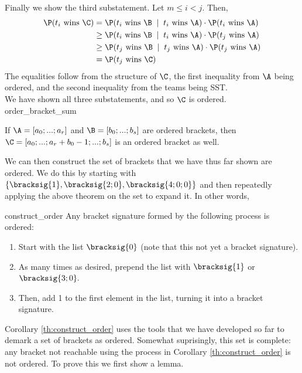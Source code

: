 {{Finally we show the third substatement. Let $m \leq i < j.$ Then,
\begin{align*}
    \P(t_i \textrm{ wins }\C) &= \P(t_i \textrm{ wins }\B \;\mid\; t_i \textrm{ wins } \A)\cdot \P(t_i \textrm{ wins } \A)\\
    &\geq \P(t_i \textrm{ wins }\B \;\mid\; t_i \textrm{ wins } \A)\cdot \P(t_j \textrm{ wins } \A)\\
    &\geq \P(t_j \textrm{ wins }\B \;\mid\; t_j \textrm{ wins } \A)\cdot \P(t_j \textrm{ wins } \A)\\
    &= \P(t_j \textrm{ wins }\C)
\end{align*}
The equalities follow from the structure of $\C$, the first inequality from $\A$ being ordered, and the second inequality from the teams being SST.\\

We have shown all three substatements, and so $\C$ is ordered.
}{order_bracket_sum}

\begin{corollary}{}{}
    If $\A = [a_0; ...; a_r]$ and $\B = [b_0; ...; b_s]$ are ordered brackets, then $\C = [a_0; ...; a_r + b_0 - 1; ...; b_s]$ is an ordered bracket as well.
\end{corollary}

We can then construct the set of brackets that we have thus far shown are ordered. We do this by starting with $\{\bracksig{1}, \bracksig{2; 0}, \bracksig{4; 0; 0}\}$ and then repeatedly applying the above theorem on the set to expand it. In other words,

\begin{corollary}{}{construct_order}
    Any bracket signature formed by the following process is ordered:
    \begin{enumerate}
        \item Start with the list $\bracksig{0}$ (note that this not yet a bracket signature).
        \item As many times as desired, prepend the list with $\bracksig{1}$ or $\bracksig{3; 0}.$
        \item Then, add 1 to the first element in the list, turning it into a bracket signature.
    \end{enumerate}
\end{corollary}

Corollary \ref{th:construct_order} uses the tools that we have developed so far to demark a set of brackets as ordered. Somewhat suprisingly, this set is complete: any bracket not reachable using the process in Corollary \ref{th:construct_order} is not ordered. To prove this we first show a lemma.

}
